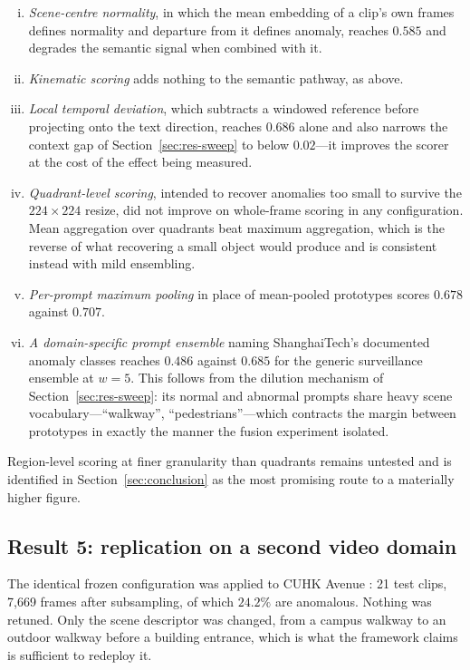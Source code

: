 \documentclass[a4paper,fleqn]{cas-sc}
\begin{document}
\begin{enumerate}[(i)]
  \item \emph{Scene-centre normality}, in which the mean embedding of a clip's
        own frames defines normality and departure from it defines anomaly,
        reaches $0.585$ and degrades the semantic signal when combined with it.
  \item \emph{Kinematic scoring} adds nothing to the semantic pathway, as above.
  \item \emph{Local temporal deviation}, which subtracts a windowed reference
        before projecting onto the text direction, reaches $0.686$ alone and
        also narrows the context gap of Section~\ref{sec:res-sweep} to below
        $0.02$---it improves the scorer at the cost of the effect being measured.
  \item \emph{Quadrant-level scoring}, intended to recover anomalies too small
        to survive the $224\times224$ resize, did not improve on whole-frame
        scoring in any configuration. Mean aggregation over quadrants beat
        maximum aggregation, which is the reverse of what recovering a small
        object would produce and is consistent instead with mild ensembling.
  \item \emph{Per-prompt maximum pooling} in place of mean-pooled prototypes
        scores $0.678$ against $0.707$.
  \item \emph{A domain-specific prompt ensemble} naming ShanghaiTech's
        documented anomaly classes reaches $0.486$ against $0.685$ for the
        generic surveillance ensemble at $w{=}5$. This follows from the dilution
        mechanism of Section~\ref{sec:res-sweep}: its normal and abnormal
        prompts share heavy scene vocabulary---``walkway'',
        ``pedestrians''---which contracts the margin between prototypes in
        exactly the manner the fusion experiment isolated.
\end{enumerate}

Region-level scoring at finer granularity than quadrants remains untested and is
identified in Section~\ref{sec:conclusion} as the most promising route to a
materially higher figure.

\subsection{Result 5: replication on a second video domain}
\label{sec:res-avenue}
The identical frozen configuration was applied to CUHK Avenue
\citep{lu2013avenue}: 21 test clips, 7{,}669 frames after subsampling, of which
$24.2\%$ are anomalous. Nothing was retuned. Only the scene descriptor was
changed, from a campus walkway to an outdoor walkway before a building entrance,
which is what the framework claims is sufficient to redeploy it.
\end{document}
